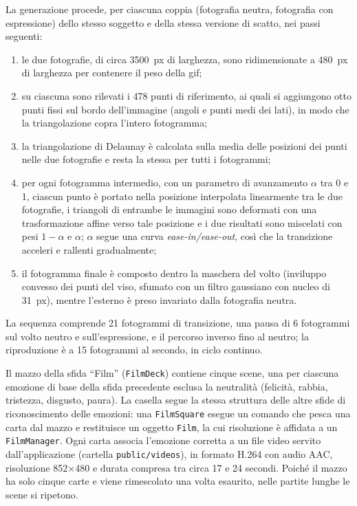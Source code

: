 \documentclass[12pt]{report}
\begin{document}
La generazione procede, per ciascuna coppia (fotografia neutra, fotografia con espressione) dello stesso soggetto e della stessa versione di scatto, nei passi seguenti:
\begin{enumerate}
    \item le due fotografie, di circa 3500~px di larghezza, sono ridimensionate a 480~px di larghezza per contenere il peso della gif;
    \item su ciascuna sono rilevati i 478 punti di riferimento, ai quali si aggiungono otto punti fissi sul bordo dell'immagine (angoli e punti medi dei lati), in modo che la triangolazione copra l'intero fotogramma;
    \item la triangolazione di Delaunay è calcolata sulla media delle posizioni dei punti nelle due fotografie e resta la stessa per tutti i fotogrammi;
    \item per ogni fotogramma intermedio, con un parametro di avanzamento $\alpha$ tra 0 e 1, ciascun punto è portato nella posizione interpolata linearmente tra le due fotografie, i triangoli di entrambe le immagini sono deformati con una trasformazione affine verso tale posizione e i due risultati sono miscelati con pesi $1-\alpha$ e $\alpha$; $\alpha$ segue una curva \textit{ease-in/ease-out}, così che la transizione acceleri e rallenti gradualmente;
    \item il fotogramma finale è composto dentro la maschera del volto (inviluppo convesso dei punti del viso, sfumato con un filtro gaussiano con nucleo di 31~px), mentre l'esterno è preso invariato dalla fotografia neutra.
\end{enumerate}
La sequenza comprende 21 fotogrammi di transizione, una pausa di 6 fotogrammi sul volto neutro e sull'espressione, e il percorso inverso fino al neutro; la riproduzione è a 15 fotogrammi al secondo, in ciclo continuo.

\label{sec:film}
Il mazzo della sfida ``Film'' (\texttt{FilmDeck}) contiene cinque scene, una per ciascuna emozione di base della sfida precedente esclusa la neutralità (felicità, rabbia, tristezza, disgusto, paura). La casella segue la stessa struttura delle altre sfide di riconoscimento delle emozioni: una \texttt{FilmSquare} esegue un comando che pesca una carta dal mazzo e restituisce un oggetto \texttt{Film}, la cui risoluzione è affidata a un \texttt{FilmManager}. Ogni carta associa l'emozione corretta a un file video servito dall'applicazione (cartella \texttt{public/videos}), in formato H.264 con audio AAC, risoluzione 852$\times$480 e durata compresa tra circa 17 e 24 secondi. Poiché il mazzo ha solo cinque carte e viene rimescolato una volta esaurito, nelle partite lunghe le scene si ripetono.
\end{document}
